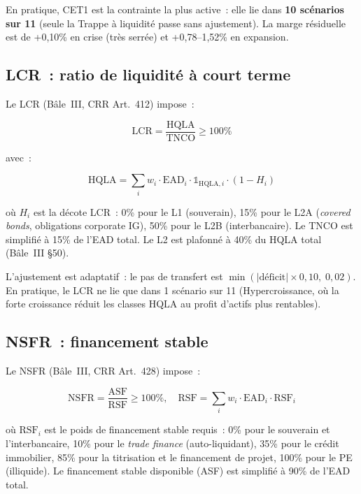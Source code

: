 \documentclass[12pt, a4paper, twoside, openright]{report}
\theoremstyle{definition}
\begin{document}
En pratique, CET1 est la contrainte la plus active~: elle lie dans \textbf{10 scénarios sur 11} (seule la Trappe à liquidité passe sans ajustement). La marge résiduelle est de +0,10\% en crise (très serrée) et +0,78--1,52\% en expansion.

\subsection{LCR~: ratio de liquidité à court terme}
\label{sec:lcr}

Le LCR (Bâle~III, CRR Art.~412) impose~:

\begin{equation}
\text{LCR} = \frac{\text{HQLA}}{\text{TNCO}} \geq 100\%
\label{eq:lcr}
\end{equation}

\noindent avec~:

\begin{equation}
\text{HQLA} = \sum_i w_i \cdot \text{EAD}_i \cdot \mathbb{1}_{\text{HQLA},i} \cdot (1 - H_i)
\label{eq:hqla}
\end{equation}

\noindent où $H_i$ est la décote LCR~: 0\% pour le L1 (souverain), 15\% pour le L2A (\textit{covered bonds}, obligations corporate IG), 50\% pour le L2B (interbancaire). Le TNCO est simplifié à 15\% de l'EAD total. Le L2 est plafonné à 40\% du HQLA total (Bâle~III §50).

L'ajustement est adaptatif~: le pas de transfert est $\min(|\text{déficit}| \times 0{,}10, \; 0{,}02)$. En pratique, le LCR ne lie que dans 1 scénario sur 11 (Hypercroissance, où la forte croissance réduit les classes HQLA au profit d'actifs plus rentables).

\subsection{NSFR~: financement stable}
\label{sec:nsfr}

Le NSFR (Bâle~III, CRR Art.~428) impose~:

\begin{equation}
\text{NSFR} = \frac{\text{ASF}}{\text{RSF}} \geq 100\%, \quad
\text{RSF} = \sum_i w_i \cdot \text{EAD}_i \cdot \text{RSF}_i
\label{eq:nsfr}
\end{equation}

\noindent où $\text{RSF}_i$ est le poids de financement stable requis~: 0\% pour le souverain et l'interbancaire, 10\% pour le \textit{trade finance} (auto-liquidant), 35\% pour le crédit immobilier, 85\% pour la titrisation et le financement de projet, 100\% pour le PE (illiquide). Le financement stable disponible (ASF) est simplifié à 90\% de l'EAD total.
\end{document}
